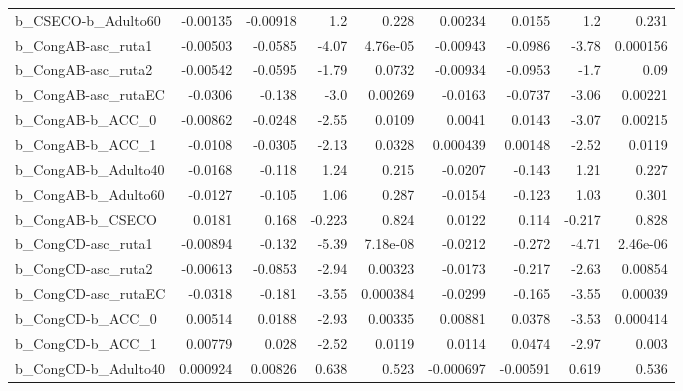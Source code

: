 \begin{tabular}{lrrrrrrrr}
b\_CSECO-b\_Adulto60         &    -0.00135 &     -0.00918 &       1.2 &    0.228 &    0.00234 &      0.0155 &          1.2 &         0.231 \\
b\_CongAB-asc\_ruta1         &    -0.00503 &      -0.0585 &     -4.07 & 4.76e-05 &   -0.00943 &     -0.0986 &        -3.78 &      0.000156 \\
b\_CongAB-asc\_ruta2         &    -0.00542 &      -0.0595 &     -1.79 &   0.0732 &   -0.00934 &     -0.0953 &         -1.7 &          0.09 \\
b\_CongAB-asc\_rutaEC        &     -0.0306 &       -0.138 &      -3.0 &  0.00269 &    -0.0163 &     -0.0737 &        -3.06 &       0.00221 \\
b\_CongAB-b\_ACC\_0           &    -0.00862 &      -0.0248 &     -2.55 &   0.0109 &     0.0041 &      0.0143 &        -3.07 &       0.00215 \\
b\_CongAB-b\_ACC\_1           &     -0.0108 &      -0.0305 &     -2.13 &   0.0328 &   0.000439 &     0.00148 &        -2.52 &        0.0119 \\
b\_CongAB-b\_Adulto40        &     -0.0168 &       -0.118 &      1.24 &    0.215 &    -0.0207 &      -0.143 &         1.21 &         0.227 \\
b\_CongAB-b\_Adulto60        &     -0.0127 &       -0.105 &      1.06 &    0.287 &    -0.0154 &      -0.123 &         1.03 &         0.301 \\
b\_CongAB-b\_CSECO           &      0.0181 &        0.168 &    -0.223 &    0.824 &     0.0122 &       0.114 &       -0.217 &         0.828 \\
b\_CongCD-asc\_ruta1         &    -0.00894 &       -0.132 &     -5.39 & 7.18e-08 &    -0.0212 &      -0.272 &        -4.71 &      2.46e-06 \\
b\_CongCD-asc\_ruta2         &    -0.00613 &      -0.0853 &     -2.94 &  0.00323 &    -0.0173 &      -0.217 &        -2.63 &       0.00854 \\
b\_CongCD-asc\_rutaEC        &     -0.0318 &       -0.181 &     -3.55 & 0.000384 &    -0.0299 &      -0.165 &        -3.55 &       0.00039 \\
b\_CongCD-b\_ACC\_0           &     0.00514 &       0.0188 &     -2.93 &  0.00335 &    0.00881 &      0.0378 &        -3.53 &      0.000414 \\
b\_CongCD-b\_ACC\_1           &     0.00779 &        0.028 &     -2.52 &   0.0119 &     0.0114 &      0.0474 &        -2.97 &         0.003 \\
b\_CongCD-b\_Adulto40        &    0.000924 &      0.00826 &     0.638 &    0.523 &  -0.000697 &    -0.00591 &        0.619 &         0.536 \\

\end{tabular}
